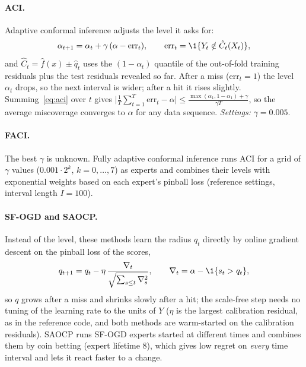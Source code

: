 \documentclass[11pt]{article}
\begin{document}
\paragraph{ACI.} Adaptive conformal inference \cite{gibbs2021aci} adjusts the level it asks for:
\begin{equation}\label{eq:aci}
\alpha_{t+1}=\alpha_t+\gamma\,(\alpha-\mathrm{err}_t),\qquad \mathrm{err}_t=\1\{Y_t\notin\hat C_t(X_t)\},
\end{equation}
and $\hat C_t=\hat f(x)\pm\hat q_t$ uses the $(1-\alpha_t)$ quantile of the out-of-fold training residuals plus the test
residuals revealed so far. After a miss ($\mathrm{err}_t=1$) the level $\alpha_t$ drops, so the next
interval is wider; after a hit it rises slightly. Summing~\eqref{eq:aci} over $t$ gives
$\big|\frac1T\sum_{t=1}^T\mathrm{err}_t-\alpha\big|\le\frac{\max(\alpha_1,1-\alpha_1)+\gamma}{\gamma T}$, so the average
miscoverage converges to $\alpha$ for any data sequence. \emph{Settings:} $\gamma=0.005$.

\paragraph{FACI.} The best $\gamma$ is unknown. Fully adaptive conformal inference \cite{gibbs2024faci} runs ACI for a grid of
$\gamma$ values ($0.001\cdot2^k$, $k=0,\dots,7$) as experts and combines their levels with exponential weights based on each
expert's pinball loss (reference settings, interval length $I=100$).

\paragraph{SF-OGD and SAOCP.} Instead of the level, these methods learn the radius $q_t$ directly by online gradient descent
on the pinball loss of the scores,
\begin{equation}
q_{t+1}=q_t-\eta\,\frac{\nabla_t}{\sqrt{\sum_{s\le t}\nabla_s^2}},\qquad \nabla_t=\alpha-\1\{s_t>q_t\},
\end{equation}
so $q$ grows after a miss and shrinks slowly after a hit; the scale-free step needs no tuning of the learning rate to the
units of $Y$ \cite{orabona2018scalefree} ($\eta$ is the largest calibration residual, as in the reference code, and both methods
are warm-started on the calibration residuals). SAOCP \cite{bhatnagar2023saocp} runs SF-OGD experts started at different times and
combines them by coin betting (expert lifetime 8), which gives low regret on \emph{every} time interval and lets it react faster to a change.
\end{document}
